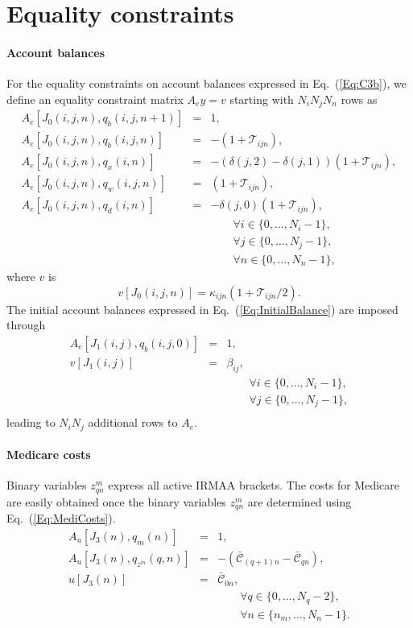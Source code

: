 \documentclass{report}[fleqn,11pt]
\begin{document}
\section{Equality constraints}

\paragraph*{Account balances}
For the equality constraints on account balances expressed in Eq.~(\ref{Eq:C3b}),
we define an equality constraint matrix $A_ey = v$ starting
with $N_iN_jN_n$ rows as
\begin{eqnarray}
	\label{Eq:B1}
	A_e[J_0(i, j, n), q_b(i, j, n+1)] &=& 1, \nonumber \\
	A_e[J_0(i, j, n), q_b(i, j, n)] &=& -(1 + \mathcal{T}_{ijn}), \nonumber \\
	A_e[J_0(i, j, n), q_x(i, n)] &=& -(\delta(j, 2) - \delta(j, 1))(1 + \mathcal{T}_{ijn}), \nonumber \\
	A_e[J_0(i, j, n), q_w(i, j, n)] &=& (1 + \mathcal{T}_{ijn}), \nonumber \\
	A_e[J_0(i, j, n), q_d(i, n)] &=& -\delta(j, 0)(1 + \mathcal{T}_{ijn}), \\
	&&\qquad\forall i \in \{0,\ldots, N_i-1\},\nonumber\\
	&&\qquad\forall j \in \{0,\ldots, N_j-1\},\nonumber\\
	&&\qquad\forall n \in \{0,\ldots, N_n-1\}, \nonumber
\end{eqnarray}
where $v$ is
\begin{equation}
	v[J_0(i, j, n)] = \kappa_{ijn}(1 + \mathcal{T}_{ijn}/2).
\end{equation}
The initial account balances expressed in Eq.~(\ref{Eq:InitialBalance}) are imposed through
\begin{eqnarray}
	A_e[J_1(i, j), q_b(i, j, 0)] &=& 1, \nonumber \\
	v[J_1(i, j)] &=& \beta_{ij},  \\
	&&\qquad\forall i \in \{0,\ldots, N_i-1\},\nonumber\\
	&&\qquad\forall j \in \{0,\ldots, N_j-1\},\nonumber\\
\end{eqnarray}
leading to $N_i N_j$ additional rows to $A_e$.

\paragraph*{Medicare costs}
Binary variables $z_{qn}^m$ express all active IRMAA brackets.
The costs for Medicare are easily obtained once the binary variables
$z^m_{qn}$ are determined using Eq.~(\ref{Eq:MediCosts}).
\begin{eqnarray}
	A_u[J_3(n), q_{m}(n)] &=& 1, \nonumber \\
	A_u[J_3(n), q_{z^m}(q, n)] &=& -(\bar{\mathcal{C}}_{(q+1)n} - \bar{\mathcal{C}}_{qn}), \nonumber \\
	u[J_3(n)] &=& \bar{\mathcal{C}}_{0n},\\
	&&\qquad\forall q \in \{0,\ldots, N_q - 2\}, \nonumber\\
	&&\qquad\forall n \in \{n_m,\ldots, N_n - 1\}.\nonumber
\end{eqnarray}
\end{document}
